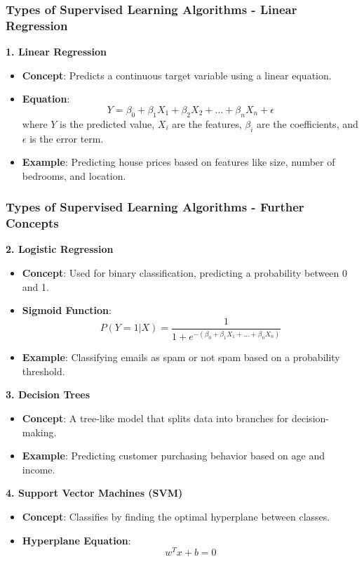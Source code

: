 \documentclass[aspectratio=169]{beamer}
\begin{document}
\begin{frame}[fragile]
    \frametitle{Types of Supervised Learning Algorithms - Linear Regression}
    \textbf{1. Linear Regression}
    \begin{itemize}
        \item \textbf{Concept}: Predicts a continuous target variable using a linear equation.
        \item \textbf{Equation}:
        \begin{equation}
            Y = \beta_0 + \beta_1 X_1 + \beta_2 X_2 + \ldots + \beta_n X_n + \epsilon
        \end{equation}
        where \(Y\) is the predicted value, \(X_i\) are the features, \(\beta_i\) are the coefficients, and \(\epsilon\) is the error term.
        \item \textbf{Example}: Predicting house prices based on features like size, number of bedrooms, and location.
    \end{itemize}
\end{frame}

\begin{frame}[fragile]
    \frametitle{Types of Supervised Learning Algorithms - Further Concepts}
    \textbf{2. Logistic Regression}
    \begin{itemize}
        \item \textbf{Concept}: Used for binary classification, predicting a probability between 0 and 1.
        \item \textbf{Sigmoid Function}:
        \begin{equation}
            P(Y=1|X) = \frac{1}{1 + e^{-(\beta_0 + \beta_1 X_1 + \ldots + \beta_n X_n)}}
        \end{equation}
        \item \textbf{Example}: Classifying emails as spam or not spam based on a probability threshold.
    \end{itemize}
    
    \bigskip
    
    \textbf{3. Decision Trees}
    \begin{itemize}
        \item \textbf{Concept}: A tree-like model that splits data into branches for decision-making.
        \item \textbf{Example}: Predicting customer purchasing behavior based on age and income.
    \end{itemize}
    
    \bigskip
    
    \textbf{4. Support Vector Machines (SVM)}
    \begin{itemize}
        \item \textbf{Concept}: Classifies by finding the optimal hyperplane between classes.
        \item \textbf{Hyperplane Equation}:
        \begin{equation}
            w^T x + b = 0
        \end{equation}
    \end{itemize}
\end{frame}
\end{document}
